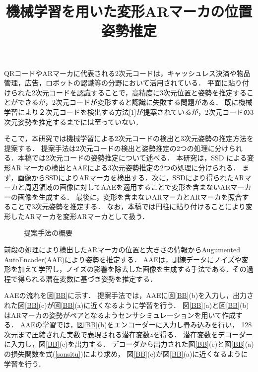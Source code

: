 \documentclass{jsarticle}
\title{機械学習を用いた変形ARマーカの位置姿勢推定}
\begin{document}
\maketitle

QRコードやARマーカに代表される2次元コードは，キャッシュレス決済や物品管理，広告，ロボットの認識等の分野において活用されている．
平面に貼り付けられた2次元コードを認識することで，高精度に3次元位置と姿勢を推定することができるが，2次元コードが変形すると認識に失敗する問題がある．
既に機械学習により２次元コードを検出する方法[1]が提案されているが，2次元コードの3次元姿勢を推定するまでには至っていない．

そこで，本研究では機械学習による2次元コードの検出と3次元姿勢の推定方法を提案する．
提案手法は2次元コードの検出と姿勢推定の2つの処理に分けられる．本稿では2次元コードの姿勢推定について述べる．
本研究は，SSD による変形AR マーカの検出とAAEによる3次元姿勢推定の2つの処理に分けられる．
まず，画像からSSDによりARマーカを検出する．次に，SSDにより得られたARマーカと周辺領域の画像に対してAAEを適用することで変形を含まないARマーカーの画像を生成する．
最後に，変形を含まないARマーカとARマーカを照合することで3次元姿勢を推定する．
なお，本稿では円柱に貼り付けることにより変形したARマーカを変形ARマーカとして扱う．

\begin{figure}[ht]
\vspace{0zh}
\setlength{\epsfxsize}{7.5cm}
\centerline{}
\vspace{-1zh}
\caption{提案手法の概要}
\label{flow}
\vspace{-2zh}
\end{figure}

前段の処理により検出したARマーカの位置と大きさの情報からAugumented AutoEncoder(AAE)により姿勢を推定する．
AAEは，訓練データにノイズや変形を加えて学習し，ノイズの影響を除去した画像を生成する手法である．その過程で得られる潜在変数に基づき姿勢を推定する．

AAEの流れを図\ref{BB}に示す．
提案手法では，AAEに図\ref{BB}(b)を入力し，出力された図\ref{BB}(c)が図\ref{BB}(a)に近くなるように学習を行う．
図\ref{BB}(a)と図\ref{BB}(b)はARマーカの姿勢がペアとなるようセンサシミュレーションを用いて作成する．
AAEの学習では，図\ref{BB}(b)をエンコーダーに入力し畳み込みを行い，
128次元まで圧縮された実数で表現される潜在変数$z$を得る．
潜在変数をデコーダーに入力し，図\ref{BB}(c)を出力する．
デコーダから出力された図\ref{BB}(c)と図\ref{BB}(a)の損失関数を式(\ref{sonsitu})により求め，
図\ref{BB}(c)が図\ref{BB}(a)に近くなるように学習を行う．
\end{document}

